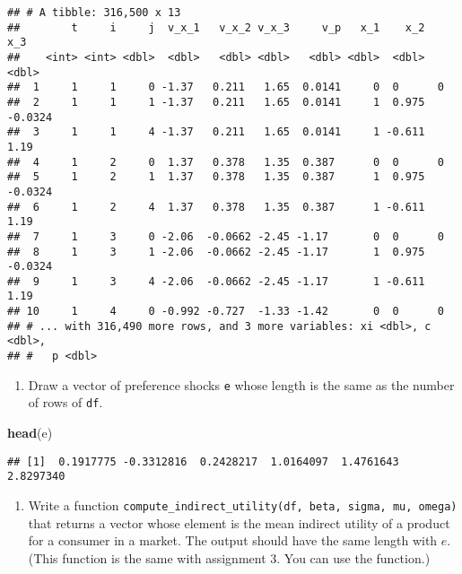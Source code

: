 \documentclass[
]{book}
\newenvironment{Shaded}{\begin{snugshade}}{\end{snugshade}}
\newcommand{\KeywordTok}[1]{\textcolor[rgb]{0.13,0.29,0.53}{\textbf{#1}}}
\newcommand{\NormalTok}[1]{#1}
\providecommand{\tightlist}{%
  \setlength{\itemsep}{0pt}\setlength{\parskip}{0pt}}
\begin{document}
\begin{verbatim}
## # A tibble: 316,500 x 13
##        t     i     j  v_x_1   v_x_2 v_x_3     v_p   x_1    x_2     x_3
##    <int> <int> <dbl>  <dbl>   <dbl> <dbl>   <dbl> <dbl>  <dbl>   <dbl>
##  1     1     1     0 -1.37   0.211   1.65  0.0141     0  0      0     
##  2     1     1     1 -1.37   0.211   1.65  0.0141     1  0.975 -0.0324
##  3     1     1     4 -1.37   0.211   1.65  0.0141     1 -0.611  1.19  
##  4     1     2     0  1.37   0.378   1.35  0.387      0  0      0     
##  5     1     2     1  1.37   0.378   1.35  0.387      1  0.975 -0.0324
##  6     1     2     4  1.37   0.378   1.35  0.387      1 -0.611  1.19  
##  7     1     3     0 -2.06  -0.0662 -2.45 -1.17       0  0      0     
##  8     1     3     1 -2.06  -0.0662 -2.45 -1.17       1  0.975 -0.0324
##  9     1     3     4 -2.06  -0.0662 -2.45 -1.17       1 -0.611  1.19  
## 10     1     4     0 -0.992 -0.727  -1.33 -1.42       0  0      0     
## # ... with 316,490 more rows, and 3 more variables: xi <dbl>, c <dbl>,
## #   p <dbl>
\end{verbatim}

\begin{enumerate}
\def\labelenumi{\arabic{enumi}.}
\setcounter{enumi}{5}
\tightlist
\item
  Draw a vector of preference shocks \texttt{e} whose length is the same as the number of rows of \texttt{df}.
\end{enumerate}

\begin{Shaded}
\begin{Highlighting}[]
\KeywordTok{head}\NormalTok{(e)}
\end{Highlighting}
\end{Shaded}

\begin{verbatim}
## [1]  0.1917775 -0.3312816  0.2428217  1.0164097  1.4761643  2.8297340
\end{verbatim}

\begin{enumerate}
\def\labelenumi{\arabic{enumi}.}
\setcounter{enumi}{6}
\tightlist
\item
  Write a function \texttt{compute\_indirect\_utility(df,\ beta,\ sigma,\ mu,\ omega)} that returns a vector whose element is the mean indirect utility of a product for a consumer in a market. The output should have the same length with \(e\). (This function is the same with assignment 3. You can use the function.)
\end{enumerate}
\end{document}
